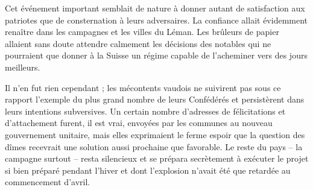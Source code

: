 \documentclass[french,twoside]{book} %
\begin{document}
Cet événement important semblait de nature à donner autant de satisfaction aux patriotes que de consternation à leurs adversaires. La confiance allait évidemment renaître dans les campagnes et les villes du Léman. Les brûleurs de papier allaient sans doute attendre calmement les décisions des notables qui ne pourraient que donner à la Suisse un régime capable de l’acheminer vers des jours meilleurs.\par
Il n’en fut rien cependant ; les mécontents vaudois ne suivirent pas sous ce rapport l’exemple du plus grand nombre de leurs Confédérés et persistèrent dans leurs intentions subversives. Un certain nombre d’adresses de félicitations et d’attachement furent, il est vrai, envoyées par les communes au nouveau gouvernement unitaire, mais elles exprimaient le ferme espoir que la question des dîmes recevrait une solution aussi prochaine que favorable. Le reste du pays – la campagne surtout – resta silencieux et se prépara secrètement à exécuter le projet si bien préparé pendant l’hiver et dont l’explosion n’avait été que retardée au commencement d’avril.\par
\end{document}
